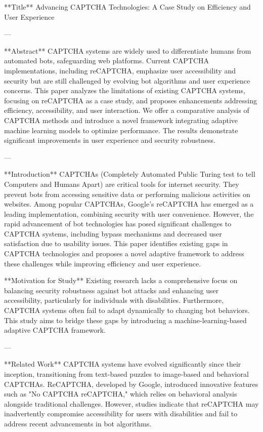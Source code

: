 **Title**  
Advancing CAPTCHA Technologies: A Case Study on Efficiency and User Experience  

---

**Abstract**  
CAPTCHA systems are widely used to differentiate humans from automated bots, safeguarding web platforms. Current CAPTCHA implementations, including reCAPTCHA, emphasize user accessibility and security but are still challenged by evolving bot algorithms and user experience concerns. This paper analyzes the limitations of existing CAPTCHA systems, focusing on reCAPTCHA as a case study, and proposes enhancements addressing efficiency, accessibility, and user interaction. We offer a comparative analysis of CAPTCHA methods and introduce a novel framework integrating adaptive machine learning models to optimize performance. The results demonstrate significant improvements in user experience and security robustness.  

---

**Introduction**  
CAPTCHAs (Completely Automated Public Turing test to tell Computers and Humans Apart) are critical tools for internet security. They prevent bots from accessing sensitive data or performing malicious activities on websites. Among popular CAPTCHAs, Google's reCAPTCHA has emerged as a leading implementation, combining security with user convenience. However, the rapid advancement of bot technologies has posed significant challenges to CAPTCHA systems, including bypass mechanisms and decreased user satisfaction due to usability issues. This paper identifies existing gaps in CAPTCHA technologies and proposes a novel adaptive framework to address these challenges while improving efficiency and user experience.  

**Motivation for Study**  
Existing research lacks a comprehensive focus on balancing security robustness against bot attacks and enhancing user accessibility, particularly for individuals with disabilities. Furthermore, CAPTCHA systems often fail to adapt dynamically to changing bot behaviors. This study aims to bridge these gaps by introducing a machine-learning-based adaptive CAPTCHA framework.  

---

**Related Work**  
CAPTCHA systems have evolved significantly since their inception, transitioning from text-based puzzles to image-based and behavioral CAPTCHAs. ReCAPTCHA, developed by Google, introduced innovative features such as "No CAPTCHA reCAPTCHA," which relies on behavioral analysis alongside traditional challenges. However, studies indicate that reCAPTCHA may inadvertently compromise accessibility for users with disabilities and fail to address recent advancements in bot algorithms.  

